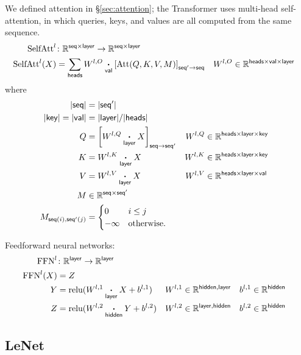 \documentclass{article}
\newcommand{\reals}{\mathbb{R}}
\begin{document}
We defined attention in \S\ref{sec:attention}; the Transformer uses multi-head self-attention, in which queries, keys, and values are all computed from the same sequence.
\begin{align*}
  \text{SelfAtt}^l &\colon \mathbb{R}^{\name{seq} \times \name{layer}} \rightarrow \mathbb{R}^{\name{seq} \times \name{layer}} \\
  \text{SelfAtt}^l(X) &= \nsum{heads} W^{l,O} \ndot{val} \nmov{seq'}{seq}{\text{Att}(Q, K, V, M)} & W^{l,O} &\in \mathbb{R}^{\name{heads} \times \name{val} \times \name{layer}}
\end{align*}
where
\begin{align*}
  |\name{seq}| &= |\name{seq'}| \\
  |\name{key}| = |\name{val}| &= |\name{layer}|/|\name{heads}| \\
  Q &= \nmov{seq}{seq'}{W^{l,Q} \ndot{layer} X} & W^{l,Q} &\in \mathbb{R}^{\name{heads} \times \name{layer} \times \name{key}} \\
  K &= W^{l,K} \ndot{layer} X & W^{l,K} &\in \mathbb{R}^{\name{heads} \times \name{layer} \times \name{key}} \\
  V &= W^{l,V} \ndot{layer} X & W^{l,V} &\in \mathbb{R}^{\name{heads} \times \name{layer} \times \name{val}} \\
  M & \in \reals^{\name{seq} \times \name{seq'}} \\
  M_{\nidx{seq}{i}, \nidx{seq'}{j}} &= \begin{cases}
    0 & i \leq j\\
    -\infty & \text{otherwise.}
  \end{cases}
\end{align*}

Feedforward neural networks:
\begin{align*}
  \text{FFN}^l &\colon \mathbb{R}^{\name{layer}} \rightarrow \mathbb{R}^{\name{layer}} \\
  \text{FFN}^l(X) &= Z \\
  Y &= \text{relu}(W^{l,1} \ndot{layer} X + b^{l,1}) & W^{l,1} &\in \mathbb{R}^{\name{hidden}, \name{layer}} & b^{l,1} &\in \mathbb{R}^{\name{hidden}} \\
  Z &= \text{relu}(W^{l,2} \ndot{hidden} Y + b^{l,2}) & W^{l,2} &\in \mathbb{R}^{\name{layer}, \name{hidden}} & b^{l,2} &\in \mathbb{R}^{\name{hidden}}
\end{align*}

\subsection{LeNet}
\end{document}
